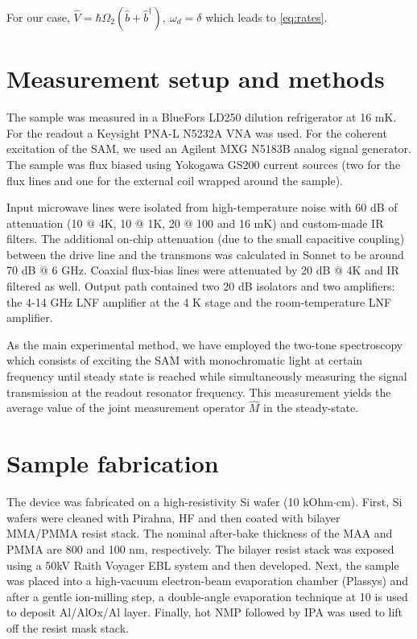 \documentclass[%
 pra,
 amsmath,amssymb,
 reprint,%
]{revtex4-1}
\begin{document}
For our case, $\hat V = \hbar \Omega_2 (\hat b + \hat b^\dag),\ \omega_d = \delta$ which leads to \eqref{eq:rates}.

\section{Measurement setup and 
methods}\label{sec:meas_setup}
The sample was measured in a BlueFors LD250 dilution refrigerator at 16 mK. For the readout a Keysight PNA-L N5232A VNA was used. For the coherent excitation of the SAM, we used an Agilent MXG N5183B analog signal generator. The sample was 
flux biased using Yokogawa GS200 current sources (two for the flux lines and one for the external coil wrapped around the sample).

Input microwave lines were isolated from 
high-temperature noise with 60 dB of attenuation 
(10 @ 4K, 10 @ 1K, 20 @ 100 and 16 mK) and 
custom-made IR filters. The additional on-chip 
attenuation (due to the small capacitive 
coupling) between the drive line and the 
transmons was calculated in Sonnet to be around 
70 dB @ 6 GHz. Coaxial flux-bias lines were 
attenuated by 20 dB @ 4K and IR filtered as well. 
Output path contained two 20 dB isolators and two 
amplifiers: the 4-14 GHz LNF amplifier at the 4 K 
stage and the room-temperature LNF amplifier.

As the main experimental method, we have employed the two-tone spectroscopy which consists of exciting the SAM with monochromatic light at certain frequency until steady state is reached while simultaneously measuring the signal transmission at the readout resonator frequency. This measurement yields the average value of the joint measurement operator $\hat M$ in the steady-state.


\section{Sample fabrication}\label{sec:fab}
The device was fabricated on a high-resistivity
Si wafer (10 kOhm$\cdot$cm). First, Si wafers 
were cleaned with Pirahna, HF and then coated 
with bilayer MMA/PMMA resist stack. The nominal 
after-bake thickness of the MAA and PMMA are 800 
and 100 nm, respectively. The
bilayer resist stack was exposed using a 50kV 
Raith Voyager EBL system and then developed. 
Next, the sample was placed into a high-vacuum 
electron-beam evaporation
chamber (Plassys) and after a gentle ion-milling 
step, a double-angle evaporation technique at 10 
is used to deposit Al/AlOx/Al layer. Finally, hot 
NMP followed by IPA was used to lift off the 
resist mask stack.


\end{document}
